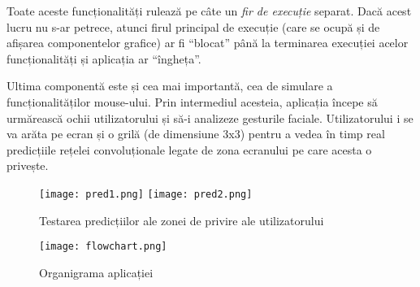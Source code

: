 Toate aceste funcționalități rulează pe câte un \emph{fir de execuție} separat.
Dacă acest lucru nu s-ar petrece, atunci firul principal de execuție (care se ocupă și de afișarea componentelor grafice) ar fi ``blocat'' până la terminarea execuției acelor funcționalități și aplicația ar ``îngheța''.

Ultima componentă este și cea mai importantă, cea de simulare a funcționalităților mouse-ului.
Prin intermediul acesteia, aplicația începe să urmărească ochii utilizatorului și să-i analizeze gesturile faciale.
Utilizatorului i se va arăta pe ecran și o grilă (de dimensiune 3x3) pentru a vedea în timp real predicțiile rețelei convoluționale legate de zona ecranului pe care acesta o privește.

\begin{figure}[H]
    \centering
    \texttt{[image: pred1.png]}
    \texttt{[image: pred2.png]}
    \caption{Testarea predicțiilor ale zonei de privire ale utilizatorului}
\end{figure}

\begin{figure}[ht]
    \centering
    \texttt{[image: flowchart.png]}
    \caption{Organigrama aplicației}
\end{figure}
